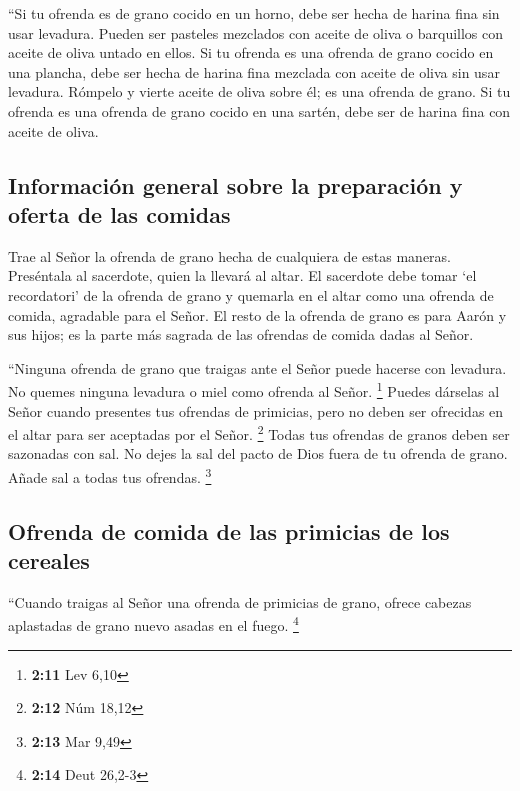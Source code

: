  ``Si tu ofrenda es de grano cocido en un horno, debe ser
hecha de harina fina sin usar levadura. Pueden ser pasteles mezclados
con aceite de oliva o barquillos con aceite de oliva untado en ellos.
 Si tu ofrenda es una ofrenda de grano cocido en una
plancha, debe ser hecha de harina fina mezclada con aceite de oliva sin
usar levadura.  Rómpelo y vierte aceite de oliva sobre él;
es una ofrenda de grano.  Si tu ofrenda es una ofrenda de
grano cocido en una sartén, debe ser de harina fina con aceite de oliva.

\hypertarget{informaciuxf3n-general-sobre-la-preparaciuxf3n-y-oferta-de-las-comidas}{%
\subsection{Información general sobre la preparación y oferta de las
comidas}\label{informaciuxf3n-general-sobre-la-preparaciuxf3n-y-oferta-de-las-comidas}}

 Trae al Señor la ofrenda de grano hecha de cualquiera de
estas maneras. Preséntala al sacerdote, quien la llevará al altar.
 El sacerdote debe tomar `el recordatori' de la ofrenda de
grano y quemarla en el altar como una ofrenda de comida, agradable para
el Señor.  El resto de la ofrenda de grano es para Aarón
y sus hijos; es la parte más sagrada de las ofrendas de comida dadas al
Señor.

 ``Ninguna ofrenda de grano que traigas ante el Señor
puede hacerse con levadura. No quemes ninguna levadura o miel como
ofrenda al Señor. \footnote{\textbf{2:11} Lev 6,10} 
Puedes dárselas al Señor cuando presentes tus ofrendas de primicias,
pero no deben ser ofrecidas en el altar para ser aceptadas por el Señor.
\footnote{\textbf{2:12} Núm 18,12}  Todas tus ofrendas de
granos deben ser sazonadas con sal. No dejes la sal del pacto de Dios
fuera de tu ofrenda de grano. Añade sal a todas tus ofrendas.
\footnote{\textbf{2:13} Mar 9,49}

\hypertarget{ofrenda-de-comida-de-las-primicias-de-los-cereales}{%
\subsection{Ofrenda de comida de las primicias de los
cereales}\label{ofrenda-de-comida-de-las-primicias-de-los-cereales}}

 ``Cuando traigas al Señor una ofrenda de primicias de
grano, ofrece cabezas aplastadas de grano nuevo asadas en el fuego.
\footnote{\textbf{2:14} Deut 26,2-3}

